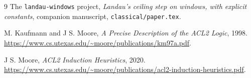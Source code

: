 \documentclass[11pt]{amsart}
\theoremstyle{definition}
\theoremstyle{remark}
\numberwithin{equation}{section}
\newcommand{\code}[1]{\nolinkurl{#1}}
\begin{document}
\begin{thebibliography}{9}
The \texttt{landau-windows} project,
\emph{Landau's ceiling step on windows, with explicit constants},
companion manuscript, \code{classical/paper.tex}.

M. Kaufmann and J S. Moore,
\emph{A Precise Description of the ACL2 Logic}, 1998.
\url{https://www.cs.utexas.edu/~moore/publications/km97a.pdf}.

J S. Moore, \emph{ACL2 Induction Heuristics}, 2020.
\url{https://www.cs.utexas.edu/~moore/publications/acl2-induction-heuristics.pdf}.
\end{thebibliography}
\end{document}
